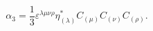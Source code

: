 \begin{equation}
\alpha _{3}=\frac{1}{3}\varepsilon ^{\lambda \mu \nu \rho }\eta _{(\lambda
)}^{*}C_{(\mu )}C_{(\nu )}C_{(\rho )}.  \label{cin25}
\end{equation}

